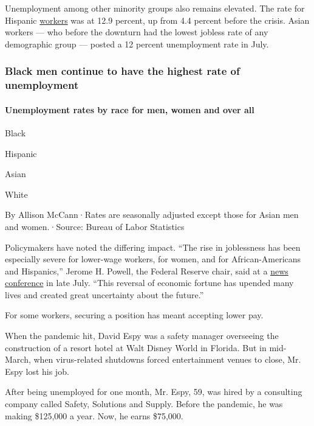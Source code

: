 Unemployment among other minority groups also remains elevated. The rate
for Hispanic
\href{https://www.bls.gov/news.release/empsit.t03.htm}{workers} was at
12.9 percent, up from 4.4 percent before the crisis. Asian workers ---
who before the downturn had the lowest jobless rate of any demographic
group --- posted a 12 percent unemployment rate in July.

\hypertarget{black-men-continue-to-have-the-highest-rate-of-unemployment}{%
\subsubsection{Black men continue to have the highest rate of
unemployment}\label{black-men-continue-to-have-the-highest-rate-of-unemployment}}

\hypertarget{unemployment-rates-by-race-for-men-women-and-over-all}{%
\paragraph{Unemployment rates by race for men, women and over
all}\label{unemployment-rates-by-race-for-men-women-and-over-all}}

Black

Hispanic

Asian

White

By Allison McCann·Rates are seasonally adjusted except those for Asian
men and women.·Source: Bureau of Labor Statistics

Policymakers have noted the differing impact. ``The rise in joblessness
has been especially severe for lower-wage workers, for women, and for
African-Americans and Hispanics,'' Jerome H. Powell, the Federal Reserve
chair, said at a
\href{https://www.federalreserve.gov/mediacenter/files/FOMCpresconf20200729.pdf}{news
conference} in late July. ``This reversal of economic fortune has
upended many lives and created great uncertainty about the future.''

For some workers, securing a position has meant accepting lower pay.

When the pandemic hit, David Espy was a safety manager overseeing the
construction of a resort hotel at Walt Disney World in Florida. But in
mid-March, when virus-related shutdowns forced entertainment venues to
close, Mr. Espy lost his job.

After being unemployed for one month, Mr. Espy, 59, was hired by a
consulting company called Safety, Solutions and Supply. Before the
pandemic, he was making \$125,000 a year. Now, he earns \$75,000.

